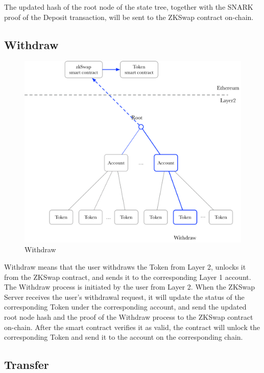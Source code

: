 \documentclass[]{template/llncs}
\begin{document}
The updated hash of the root node of the state tree, together with the SNARK proof of the Deposit transaction, will be sent to the ZKSwap contract on-chain.

\subsection{Withdraw}

\begin{figure}[htbp]
\centering
\includegraphics[width=0.9\columnwidth]{figure/withdraw}
\caption{Withdraw}
\label{fig:withdraw}
\end{figure}

Withdraw means that the user withdraws the Token from Layer 2, unlocks it from the ZKSwap contract, and sends it to the corresponding Layer 1 account. The Withdraw process is initiated by the user from Layer 2. When the ZKSwap Server receives the user’s withdrawal request, it will update the status of the corresponding Token under the corresponding account, and send the updated root node hash and the proof of the Withdraw process to the ZKSwap contract on-chain. After the smart contract verifies it as valid, the contract will unlock the corresponding Token and send it to the account on the corresponding chain.


\subsection{Transfer}
\end{document}
